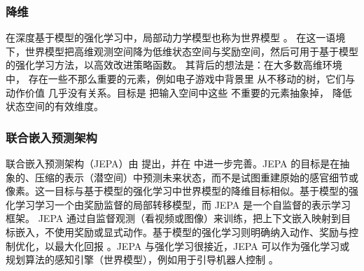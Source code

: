 \subsubsection{降维}
在深度基于模型的强化学习中，局部动力学模型也称为世界模型 \citep{ha2018world}。
在这一语境下，世界模型把高维观测空间降为低维状态空间与奖励空间，然后可用于基于模型的强化学习方法，以高效改进策略函数。
其背后的想法是：在大多数高维环境中，
存在一些不那么重要的元素，例如电子游戏中背景里
从不移动的树，它们与动作价值
几乎没有关系。目标是
把输入空间中这些
不重要的元素抽象掉，
降低状态空间的有效维度。

\subsubsection{联合嵌入预测架构}
联合嵌入预测架构（JEPA）由 \citet{lecun2022path} 提出，并在 \citet{assran2023self} 中进一步完善。JEPA 的目标是在抽象的、压缩的表示（潜空间）中预测未来状态，而不是试图重建原始的感官细节或像素。这一目标与基于模型的强化学习中世界模型的降维目标相似。基于模型的强化学习学习一个由奖励监督的局部转移模型，而 JEPA 是一个自监督的表示学习框架。
JEPA 通过自监督观测（看视频或图像）来训练，把上下文嵌入映射到目标嵌入，不使用奖励或显式动作。基于模型的强化学习则明确纳入动作、奖励与控制优化，以最大化回报 \citep{lim2026jedi}。JEPA 与强化学习很接近，JEPA 可以作为强化学习或规划算法的感知引擎（世界模型），例如用于引导机器人控制 \citep{destrade2025value}。


